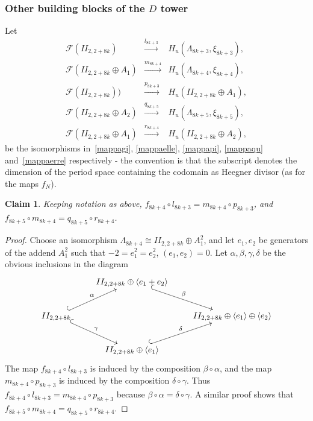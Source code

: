 \documentclass[11pt]{amsart}
\numberwithin{equation}{subsection}
\theoremstyle{plain}
\newtheorem{claim}[theorem]{Claim}
\theoremstyle{remark}
\theoremstyle{definition}
\newcommand{\cF}{{\mathscr F}}
\newcommand{\la}{\langle}
\newcommand{\lra}{\longrightarrow}
\newcommand{\ra}{\rangle}
\begin{document}
\subsubsection{Other building blocks  of the $D$ tower}\label{subsubsec:diriver}
\setcounter{equation}{0}
%
Let 
%
\begin{eqnarray}
%
\cF( II_{2,2+8k}) & \overset{l_{8k+3}}{\lra} & H_u(\Lambda_{8k+3},\xi_{8k+3}), \label{ellekappa} \\
%
\cF( II_{2,2+8k}\oplus A_1) & \overset{m_{8k+4}}{\lra} & H_u(\Lambda_{8k+4},\xi_{8k+4}), \label{emmekappa} \\
%
 \cF( II_{2,2+8k})) & \overset{p_{8k+3}}{\lra} & H_u(II_{2,2+8k}\oplus A_1), \label{pikappa} \\ 
%
\cF( II_{2,2+8k}\oplus A_2) & \overset{q_{8k+5}}{\lra} & H_u(\Lambda_{8k+5},\xi_{8k+5}), \label{qukappa} \\ 
%
\cF( II_{2,2+8k}\oplus A_1) & \overset{r_{8k+4}}{\lra} & H_u(II_{2,2+8k}\oplus A_2), \label{errekappa} 
%
\end{eqnarray}
%
be  the isomorphisms in~\eqref{mappagi}, \eqref{mappaelle}, \eqref{mappapi}, \eqref{mappaqu} and~\eqref{mappaerre} respectively - the convention is that the subscript denotes the dimension of the period space containing the codomain as Heegner divisor (as for the maps $f_N$). 
%
\begin{claim}\label{clm:triangolo}
%
Keeping notation as above, $f_{8k+4}\circ l_{8k+3}=m_{8k+4}\circ p_{8k+3}$, and $f_{8k+5}\circ m_{8k+4}=q_{8k+5}\circ r_{8k+4}$.
%
\end{claim}
%
%
\begin{proof}
%
Choose an isomorphism $\Lambda_{8k+4}\cong II_{2,2+8k}\oplus A_1^2$, and let $e_1,e_2$ be generators of the addend $ A_1^2$ such that $-2=e_1^2=e_2^2$, $(e_1,e_2)=0$. Let $\alpha,\beta,\gamma,\delta$ be the obvious inclusions in the  diagram 
%
\begin{equation}\label{rombo}
%
\xymatrix{
%
&   II_{2,2+8k}\oplus\la e_1+e_2\ra \ar@{^{(}->}[dr]^{\beta}  & \\
%
II_{2,2+8k}\ar@{^{(}->}[ur]^{\alpha} \ar@{^{(}->}[dr]^{\gamma} &   & II_{2,2+8k}\oplus\la e_1\ra\oplus \la e_2\ra \\
%
& II_{2,2+8k}\oplus\la e_1\ra \ar@{^{(}->}[ur]^{\delta} &
}
%
\end{equation}
%
The map $f_{8k+4}\circ l_{8k+3}$ is induced by the composition $\beta\circ\alpha$, and the map $m_{8k+4}\circ p_{8k+3}$ is induced by the composition 
$\delta\circ\gamma$. Thus $f_{8k+4}\circ l_{8k+3}=m_{8k+4}\circ p_{8k+3}$  because $\beta\circ\alpha=\delta\circ\gamma$. A similar proof shows that 
 $f_{8k+5}\circ m_{8k+4}=q_{8k+5}\circ r_{8k+4}$. 
%
\end{proof}
\end{document}
